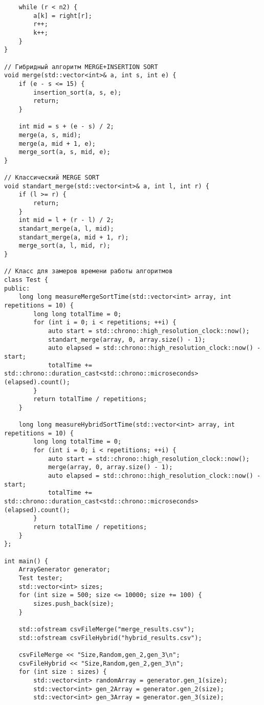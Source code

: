 \documentclass{article}
\begin{document}
\begin{lstlisting}
    while (r < n2) {
        a[k] = right[r];
        r++;
        k++;
    }
}

// Гибридный алгоритм MERGE+INSERTION SORT
void merge(std::vector<int>& a, int s, int e) {
    if (e - s <= 15) {
        insertion_sort(a, s, e);
        return;
    }

    int mid = s + (e - s) / 2;
    merge(a, s, mid);
    merge(a, mid + 1, e);
    merge_sort(a, s, mid, e);
}

// Классический MERGE SORT
void standart_merge(std::vector<int>& a, int l, int r) {
    if (l >= r) {
        return;
    }
    int mid = l + (r - l) / 2;
    standart_merge(a, l, mid);
    standart_merge(a, mid + 1, r);
    merge_sort(a, l, mid, r);
}

// Класс для замеров времени работы алгоритмов
class Test {
public:
    long long measureMergeSortTime(std::vector<int> array, int repetitions = 10) {
        long long totalTime = 0;
        for (int i = 0; i < repetitions; ++i) {
            auto start = std::chrono::high_resolution_clock::now();
            standart_merge(array, 0, array.size() - 1);
            auto elapsed = std::chrono::high_resolution_clock::now() - start;
            totalTime += std::chrono::duration_cast<std::chrono::microseconds>(elapsed).count();
        }
        return totalTime / repetitions;
    }

    long long measureHybridSortTime(std::vector<int> array, int repetitions = 10) {
        long long totalTime = 0;
        for (int i = 0; i < repetitions; ++i) {
            auto start = std::chrono::high_resolution_clock::now();
            merge(array, 0, array.size() - 1);
            auto elapsed = std::chrono::high_resolution_clock::now() - start;
            totalTime += std::chrono::duration_cast<std::chrono::microseconds>(elapsed).count();
        }
        return totalTime / repetitions;
    }
};

int main() {
    ArrayGenerator generator;
    Test tester;
    std::vector<int> sizes;
    for (int size = 500; size <= 10000; size += 100) {
        sizes.push_back(size);
    }

    std::ofstream csvFileMerge("merge_results.csv");
    std::ofstream csvFileHybrid("hybrid_results.csv");

    csvFileMerge << "Size,Random,gen_2,gen_3\n";
    csvFileHybrid << "Size,Random,gen_2,gen_3\n";
    for (int size : sizes) {
        std::vector<int> randomArray = generator.gen_1(size);
        std::vector<int> gen_2Array = generator.gen_2(size);
        std::vector<int> gen_3Array = generator.gen_3(size);


\end{lstlisting}
\end{document}

